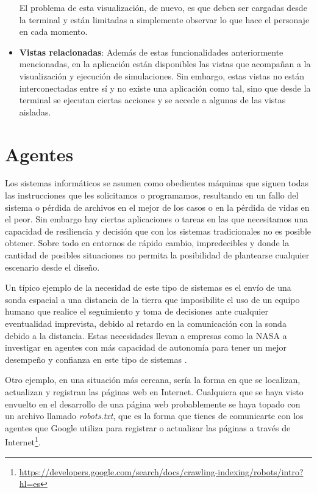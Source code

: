 \begin{itemize}
	El problema de esta visualización, de nuevo, es que deben ser cargadas desde la terminal y están limitadas a simplemente observar lo que hace el personaje en cada momento. 
	
	\item\textbf{Vistas relacionadas}: Además de estas funcionalidades anteriormente mencionadas, en la aplicación están disponibles las vistas que acompañan a la visualización y ejecución de simulaciones. 
	Sin embargo, estas vistas no están interconectadas entre sí y no existe una aplicación como tal, sino que desde la terminal se ejecutan ciertas acciones y se accede a algunas de las vistas aisladas.
	
\end{itemize}

\section{Agentes}

Los sistemas informáticos se asumen como obedientes máquinas que siguen todas las instrucciones que les solicitamos o programamos, resultando en un fallo del sistema o pérdida de archivos en el mejor de los casos o en la pérdida de vidas en el peor. Sin embargo hay ciertas aplicaciones o tareas en las que necesitamos una capacidad de resiliencia y decisión que con los sistemas tradicionales no es posible obtener. Sobre todo en entornos de rápido cambio, impredecibles y donde la cantidad de posibles situaciones no permita la posibilidad de plantearse cualquier escenario desde el diseño.

Un típico ejemplo de la necesidad de este tipo de sistemas es el envío de una sonda espacial a una distancia de la tierra que imposibilite el uso de un equipo humano que realice el seguimiento y toma de decisiones ante cualquier eventualidad imprevista, debido al retardo en la comunicación con la sonda debido a la distancia. Estas necesidades llevan a empresas como la NASA a investigar en agentes con más capacidad de autonomía para tener un mejor desempeño y confianza en este tipo de sistemas \citep{rouff2002autonomy}.

Otro ejemplo, en una situación más cercana, sería la forma en que se localizan, actualizan y registran las páginas web en Internet. Cualquiera que se haya visto envuelto en el desarrollo de una página web probablemente se haya topado con un archivo llamado \textit{robots.txt}, que es la forma que tienes de comunicarte con los agentes que Google utiliza para registrar o actualizar las páginas a través de Internet\footnote{\url{https://developers.google.com/search/docs/crawling-indexing/robots/intro?hl=es}}.

